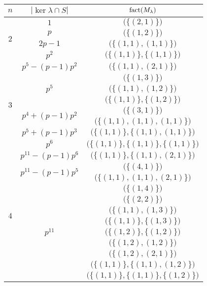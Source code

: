 \begin{table}[h]
\begin{tabular}{ccc}
\toprule
$n$&$|\ker\lambda\cap S|$&$\operatorname{fact}(M_\lambda)$\\
\midrule
\multirow{4}{*}{$2$}&$1$&$\big(\big\{(2,1)\big\}\big)$\\
\cmidrule(l){2-3}
&$p$&$\big(\big\{(1,2)\big\}\big)$\\
\cmidrule(l){2-3}
&$2p-1$&$\big(\big\{(1,1),(1,1)\big\}\big)$\\
\cmidrule(l){2-3}
&$p^2$&$\big(\big\{(1,1)\big\},\big\{(1,1)\big\}\big)$\\
\midrule
\multirow{8}{*}{$3$}&$p^5-(p-1)p^2$&$\big(\big\{(1,1),(2,1)\big\}\big)$\\
\cmidrule(l){2-3}
&\multirow{3}{*}{$p^5$}&$\big(\big\{(1,3)\big\}\big)$\\
&&$\big(\big\{(1,1),(1,2)\big\}\big)$\\
&&$\big(\big\{(1,1)\big\},\big\{(1,2)\big\}\big)$\\
\cmidrule(l){2-3}
&\multirow{2}{*}{$p^4+(p-1)p^2$}&$\big(\big\{(3,1)\big\}\big)$\\
&&$\big(\big\{(1,1),(1,1),(1,1)\big\}\big)$\\
\cmidrule(l){2-3}
&$p^5+(p-1)p^3$&$\big(\big\{(1,1)\big\},\big\{(1,1),(1,1)\big\}\big)$\\
\cmidrule(l){2-3}
&$p^6$&$\big(\big\{(1,1)\big\},\big\{(1,1)\big\},\big\{(1,1)\big\}\big)$\\
\midrule
\multirow{17}{*}{$4$}&$p^{11}-(p-1)p^6$&$\big(\big\{(1,1)\big\},\big\{(1,1),(2,1)\big\}\big)$\\
\cmidrule(l){2-3}
&\multirow{2}{*}{$p^{11}-(p-1)p^5$}&$\big(\big\{(4,1)\big\}\big)$\\
&&$\big(\big\{(1,1),(1,1),(2,1)\big\}\big)$\\
\cmidrule(l){2-3}
&\multirow{9}{*}{$p^{11}$}&$\big(\big\{(1,4)\big\}\big)$\\
&&$\big(\big\{(2,2)\big\}\big)$\\
&&$\big(\big\{(1,1),(1,3)\big\}\big)$\\
&&$\big(\big\{(1,1)\big\},\big\{(1,3)\big\}\big)$\\
&&$\big(\big\{(1,2)\big\},\big\{(1,2)\big\}\big)$\\
&&$\big(\big\{(1,2),(1,2)\big\}\big)$\\
&&$\big(\big\{(1,2),(2,1)\big\}\big)$\\
&&$\big(\big\{(1,1)\big\},\big\{(1,1),(1,2)\big\}\big)$\\
&&$\big(\big\{(1,1)\big\},\big\{(1,1)\big\},\big\{(1,2)\big\}\big)$\\

\end{tabular}
\end{table}

